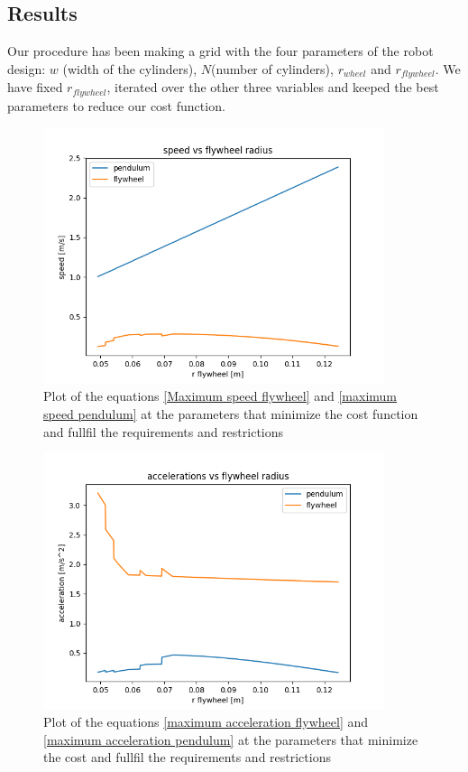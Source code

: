 \subsection{Results}
Our procedure has been making a grid with the four parameters of the robot 
design: $w$ (width of the cylinders), $N$(number of cylinders), $r_{wheel}$ and $r_{flywheel}$.
We have fixed $r_{flywheel}$, iterated over the other three variables and keeped the best parameters to reduce our cost function.


\begin{figure}[H]
	\centering
	\includegraphics[width=10cm]{img/optimization/speed.png}
	\caption{Plot of the equations \ref{Maximum speed flywheel} and \ref{maximum speed pendulum} at the parameters that minimize the cost function and fullfil the requirements and restrictions}
	\label{fig:Speed plot}
\end{figure}

\begin{figure}[H]
	\centering
	\includegraphics[width=10cm]{img/optimization/acceleration.png}
	\caption{Plot of the equations \ref{maximum acceleration flywheel} and \ref{maximum acceleration pendulum} at the parameters that minimize the cost and fullfil the requirements and restrictions}
	\label{fig:Speed plot}
\end{figure}

